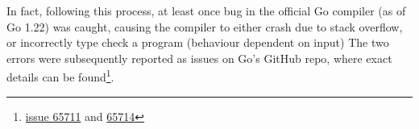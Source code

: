 
In fact, following this process, at least once bug in the official Go compiler
(as of Go 1.22) was caught, causing the compiler to either crash due to stack
overflow, or incorrectly type check a program (behaviour dependent on input)
The two errors were subsequently reported as issues on Go's GitHub repo, where
exact details can be
found\footnote{\href{https://github.com/golang/go/issues/65711}{issue 65711} and
    \href{https://github.com/golang/go/issues/65714}{65714}}.



%
